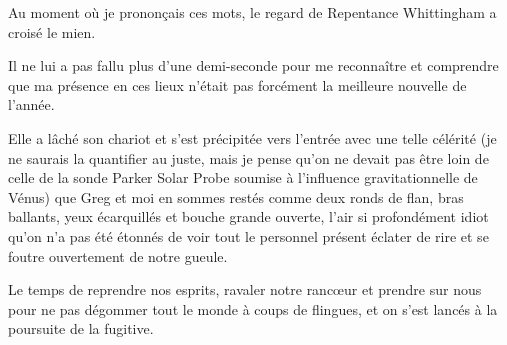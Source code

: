 Au moment où je prononçais ces mots, le regard de Repentance Whittingham a croisé le mien.

Il ne lui a pas fallu plus d’une demi-seconde pour me reconnaître et comprendre que ma présence en ces lieux n’était pas forcément la meilleure nouvelle de l’année.

Elle a lâché son chariot et s’est précipitée vers l’entrée avec une telle célérité (je ne saurais la quantifier au juste, mais je pense qu’on ne devait pas être loin de celle de la sonde Parker Solar Probe soumise à l’influence gravitationnelle de Vénus) que Greg et moi en sommes restés comme deux ronds de flan, bras ballants, yeux écarquillés et bouche grande ouverte, l’air si profondément idiot qu’on n’a pas été étonnés de voir tout le personnel présent éclater de rire et se foutre ouvertement de notre gueule.

Le temps de reprendre nos esprits, ravaler notre rancœur et prendre sur nous pour ne pas dégommer tout le monde à coups de flingues, et on s’est lancés à la poursuite de la fugitive.

